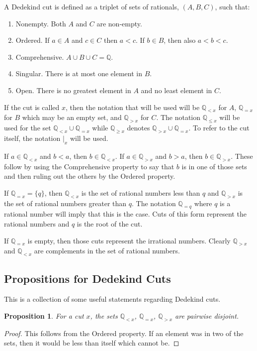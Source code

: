 \documentclass[12pt]{article}
\newtheorem{proposition}{Proposition}[section]
\newcommand{\qcut}[2][x]{\ensuremath{\mathbb{Q}_{#2 #1}}}
\newcommand{\qlt}[1][x]{\qcut[#1]{<}}
\newcommand{\qeq}[1][x]{\qcut[#1]{=}}
\newcommand{\qgt}[1][x]{\qcut[#1]{>}}
\newcommand{\qgeq}[1][x]{\qcut[#1]{\geq}}
\newcommand{\qleq}[1][x]{\qcut[#1]{\leq}}
\newcommand{\cut}[1][x]{{\vert}_{#1} }
\begin{document}
A Dedekind cut is defined as a triplet of sets of rationals, $(A, B, C)$, such that: 
\begin{enumerate}
    \item Nonempty. Both $A$ and $C$ are non-empty.
    \item Ordered. If $a \in A$ and $c \in C$ then $a < c$. If $b \in B$, then also $a < b < c$. 
    \item Comprehensive. $A \cup B \cup C = \mathbb{Q}$.
    \item Singular. There is at most one element in $B$.
    \item Open. There is no greatest element in $A$ and no least element in $C$.
\end{enumerate}
If the cut is called $x$, then the notation that will be used will be $\qlt$ for $A$, $\qeq$ for $B$ which may be an empty set, and $\qgt$ for $C$. The notation $\qleq$ will be used for the set $\qlt \cup \qeq$ while $\qgeq$ denotes $\qgt \cup \qeq$. To refer to the cut itself, the notation $\cut$ will be used. 

If $a \in \qlt$ and $b < a$, then $b \in \qlt$. If $a \in \qgt$ and $ b > a$, then $b \in \qgt$. These follow by using the Comprehensive property to say that $b$ is in one of those sets and then ruling out the others by the Ordered property. 

If $\qeq = \{q\}$, then $\qlt$ is the set of rational numbers less than $q$ and $\qgt$ is the set of rational numbers greater than $q$. The notation $\qeq[q]$ where $q$ is a rational number will imply that this is the case. Cuts of this form represent the rational numbers and $q$ is the root of the cut. 

If $\qeq$ is empty, then those cuts represent the irrational numbers. Clearly $\qgt$ and $\qlt$ are complements in the set of rational numbers. 


\subsection{Propositions for Dedekind Cuts}

This is a collection of some useful statements regarding Dedekind cuts. 

\begin{proposition}
    For a cut $x$, the sets $\qlt$, $\qeq$, $\qgt$ are pairwise disjoint. 
\end{proposition}

\begin{proof}
    This follows from the Ordered property. If an element was in two of the sets, then it would be less than itself which cannot be. 
\end{proof}
\end{document}
